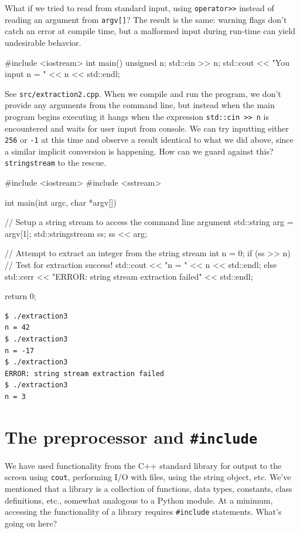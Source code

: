 \documentclass[12pt,letterpaper,twoside]{article}
\begin{document}
What if we tried to read from standard input, using \texttt{operator>>} instead of 
reading an argument from \texttt{argv[]}? The result is the same: warning flags don't
catch an error at compile time, but a malformed input during run-time can 
yield undesirable behavior.

\begin{cpp}
#include <iostream>
 int main() {
        unsigned n;
        std::cin >> n;
        std::cout << "You input n = " << n << std::endl;
}
\end{cpp}

See \texttt{src/extraction2.cpp}. When we compile and run the program, we don't provide any
arguments from the command line, but instead when the main program begins executing 
it hangs when the expression \texttt{std::cin >> n} is encountered and waits for user 
input from console. We can try inputting either \texttt{256} or \texttt{-1} at this time
and observe a result identical to what we did above, since a similar implicit conversion
is happening. How can we guard against this? \texttt{stringstream} to the rescue.

\begin{cpp}
#include <iostream>
#include <sstream>

int main(int argc, char *argv[]) {
  // Setup a string stream to access the command line argument
  std::string arg = argv[1];
  std::stringstream ss;
  ss << arg;

  // Attempt to extract an integer from the string stream
  int n = 0;
  if (ss >> n)    // Test for extraction success!
    std::cout << "n = " << n << std::endl;
  else
    std::cerr << "ERROR: string stream extraction failed" << std::endl;

  return 0;
}
\end{cpp}

\begin{verbatim}
$ ./extraction3
n = 42
$ ./extraction3
n = -17
$ ./extraction3
ERROR: string stream extraction failed
$ ./extraction3
n = 3
\end{verbatim}






\section{\texorpdfstring{The preprocessor and \texttt{\#include}}{The preprocessor and \#include}}
We have used functionality from the C++ standard library for output to
the screen using \texttt{cout}, performing I/O with files, using the
string object, etc.
We've mentioned that a library is a collection of functions, data types, constants, class
definitions, etc., somewhat analogous to a Python module.
At a minimum, accessing the functionality of a library requires
\texttt{\#include} statements. What's going on here?
\end{document}
